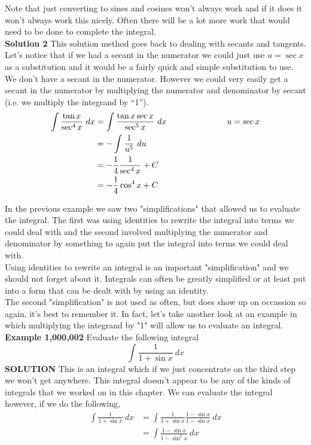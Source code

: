 \documentclass[11pt]{report}
\newlength\tindent
\renewcommand{\indent}{\hspace*{\tindent}}
\begin{document}
Note that just converting to sines and cosines won't always work and if it does it won't always work this nicely. Often there will be a lot more work that would need to be done to complete the integral.\\

\textbf{Solution 2} \indent This solution method goes back to dealing with secants and tangents. Let's notice that if we had a secant in the numerator we could just use $u = \sec x$ as a substitution and it would be a fairly quick and simple substitution to use. We don't have a secant in the numerator. However we could very easily get a secant in the numerator by multiplying the numerator and denominator by secant (i.e. we multiply the integrand by “1”). 
\begin{align*}
\int \frac{\tan x}{\sec^4 x}~dx &= \int \frac{\tan x \sec x}{\sec^5 x}~dx \hskip 1 truein u = \sec x\\
&= -\int \frac{1}{u^5} ~du \\
&=-\frac{1}{4} \frac{1}{\sec^4 x}+C\\
&=-\frac{1}{4} \cos^4 x +C
\end{align*}

In the previous example we saw two "simplifications" that allowed us to evaluate the integral. The first was using identities to rewrite the integral into terms we could deal with and the second involved multiplying the numerator and denominator by something to again put the integral into terms we could deal with.\\

Using identities to rewrite an integral is an important "simplification" and we should not forget about it. Integrals can often be greatly simplified or at least put into a form that can be dealt with by using an identity.\\

The second "simplification" is not used as often, but does show up on occassion so again, it's best to remember it. In fact, let's take another look at an example in which multiplying the integrand by "1" will allow us to evaluate an integral.\\

\textbf{Example 1,000,002} \indent Evaluate the following integral
$$\int \frac{1}{1+\sin x}~dx$$
\textbf{SOLUTION} \indent This is an integral which if we just concentrate on the third step we won't get anywhere. This integral doesn't appear to be any of the kinds of integrals that we worked on in this chapter. We can evaluate the integral however, if we do the following,
\begin{align*}
\int \frac{1}{1+\sin x}~dx &= \int \frac{1}{1+\sin x} \frac{1-\sin x}{1-\sin x}~dx \\
&= \int \frac{1-\sin x}{1-\sin^2 x}~dx 
\end{align*}
\end{document}
